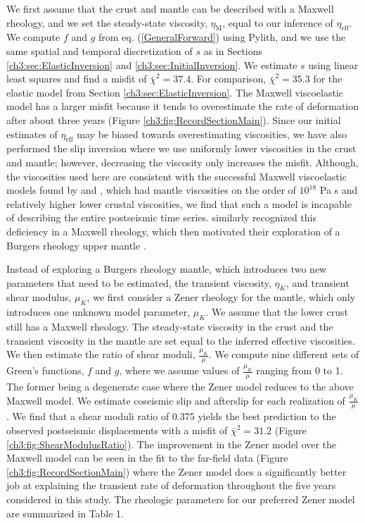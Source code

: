 We first assume that the crust and mantle can be described with a Maxwell rheology, and we set the steady-state viscosity, $\eta_\mathrm{M}$, equal to our inference of $\eta_{\mathrm{eff}}$.  We compute $f$ and $g$ from eq. (\ref{GeneralForward}) using Pylith, and we use the same spatial and temporal discretization of $s$ as in Sections \ref{ch3:sec:ElasticInversion} and \ref{ch3:sec:InitialInversion}. We estimate $s$ using linear least squares and find a misfit of $\bar\chi^2=37.4$. For comparison, $\bar\chi^2=35.3$ for the elastic model from Section \ref{ch3:sec:ElasticInversion}.  The Maxwell viscoelastic model has a larger misfit because it tends to overestimate the rate of deformation after about three years (Figure \ref{ch3:fig:RecordSectionMain}). Since our initial estimates of $\eta_\mathrm{eff}$ may be biased towards overestimating viscosities, we have also performed the slip inversion where we use uniformly lower viscosities in the crust and mantle; however, decreasing the viscosity only increases the misfit.  Although, the viscosities used here are consistent with the successful Maxwell viscoelastic models found by \citet{Rollins2015} and \citet{Spinler2015}, which had mantle viscosities on the order of $10^{18}$ Pa s and relatively higher lower crustal viscosities, we find that such a model is incapable of describing the entire postseismic time series.  \citet{Pollitz2001} similarly recognized this deficiency in a Maxwell rheology, which then motivated their exploration of a Burgers rheology upper mantle \citep{Pollitz2003}.  

Instead of exploring a Burgers rheology mantle, which introduces two new parameters that need to be estimated, the transient viscosity, $\eta_{K}$, and transient shear modulus, $\mu_{K}$, we first consider a Zener rheology for the mantle, which only introduces one unknown model parameter, $\mu_{K}$.  We assume that the lower crust still has a Maxwell rheology. The steady-state viscosity in the crust and the transient viscosity in the mantle are set equal to the inferred effective viscosities.  We then estimate the ratio of shear moduli, $\frac{\mu_K}{\mu}$. We compute nine different sets of Green's functions, $f$ and $g$, where we assume values of $\frac{\mu_K}{\mu}$ ranging from 0 to 1. The former being a degenerate case where the Zener model reduces to the above Maxwell model.  We estimate coseismic slip and afterslip for each realization of $\frac{\mu_K}{\mu}$.  We find that a shear moduli ratio of 0.375 yields the best prediction to the observed postseismic displacements with a misfit of $\bar\chi^2=31.2$ (Figure \ref{ch3:fig:ShearModulusRatio}).  The improvement in the Zener model over the Maxwell model can be seen in the fit to the far-field data (Figure \ref{ch3:fig:RecordSectionMain}) where the Zener model does a significantly better job at explaining the transient rate of deformation throughout the five years considered in this study.  The rheologic parameters for our preferred Zener model are summarized in Table 1.

